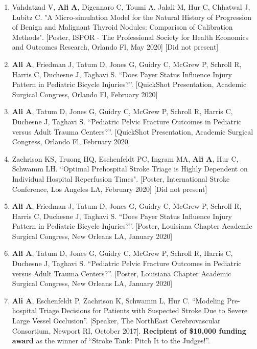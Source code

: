 \documentclass{article}
\newcommand{\nl}{\noindent \normalsize}
\begin{document}
	\begin{enumerate}

		\item \nl Vahdatzad V, \textbf{Ali A}, Digennaro C, Toumi A, Jalali M, Hur C, Chhatwal J, Lubitz C. "A Micro-simulation Model for the Natural History of Progression of Benign and Malignant Thyroid Nodules: Comparison of Calibration Methods". [Poster, ISPOR - The Professional Society for Health Economics and Outcomes Research, Orlando Fl, May 2020] [Did not present]

		\item \nl \textbf{Ali A}, Friedman J, Tatum D, Jones G, Guidry C, McGrew P, Schroll R, Harris C, Duchesne J, Taghavi S. “Does Payer Status Influence Injury Pattern in Pediatric Bicycle Injuries?”. [QuickShot Presentation, Academic Surgical Congress, Orlando Fl, February 2020]

		\item \nl \textbf{Ali A}, Tatum D, Jones G, Guidry C, McGrew P, Schroll R, Harris C, Duchesne J, Taghavi S. “Pediatric Pelvic Fracture Outcomes in Pediatric versus Adult Trauma Centers?”. [QuickShot Presentation, Academic Surgical Congress, Orlando Fl, February 2020]

		\item \nl Zachrison KS, Truong HQ, Eschenfeldt PC, Ingram MA, \textbf{Ali A}, Hur C, Schwamm LH. ``Optimal Prehospital Stroke Triage is Highly Dependent on Individual Hospital Reperfusion Times". [Poster, International Stroke Conference, Los Angeles LA, February 2020] [Did not present]

		\item \nl \textbf{Ali A}, Friedman J, Tatum D, Jones G, Guidry C, McGrew P, Schroll R, Harris C, Duchesne J, Taghavi S. “Does Payer Status Influence Injury Pattern in Pediatric Bicycle Injuries?”. [Poster, Louisiana Chapter Academic Surgical Congress, New Orleans LA, January 2020]

		\item \nl \textbf{Ali A}, Tatum D, Jones G, Guidry C, McGrew P, Schroll R, Harris C, Duchesne J, Taghavi S. “Pediatric Pelvic Fracture Outcomes in Pediatric versus Adult Trauma Centers?”. [Poster, Louisiana Chapter Academic Surgical Congress, New Orleans LA, January 2020]

		\item \nl \textbf{Ali A}, Eschenfeldt P, Zachrison K, Schwamm L, Hur C. ``Modeling Pre-hospital Triage Decisions for Patients with Suspected Stroke Due to Severe Large Vessel Occlusion''. [Speaker, The NorthEast Cerebrovascular Consortium, Newport RI, October 2017]. \textbf{Recipient of \$10,000 funding award} as the winner of ``Stroke Tank: Pitch It to the Judges!''.
	

\end{enumerate}
\end{document}
